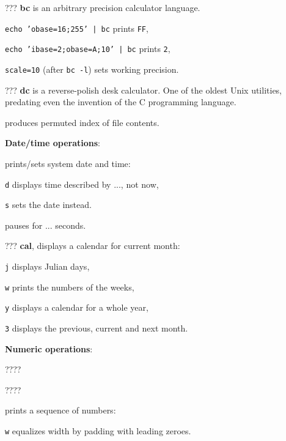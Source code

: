 \begin{compactenum}
\item [???] \textbf{bc} is an arbitrary precision calculator language.
\item \texttt{echo 'obase=16;255' | bc} prints \texttt{FF},
\item \texttt{echo 'ibase=2;obase=A;10' | bc} prints \texttt{2},
\item \texttt{scale=10} (after \texttt{bc -l}) sets working precision.
\item [???] \textbf{dc} is a reverse-polish desk calculator.
One of the oldest Unix utilities, 
predating even the invention of the C programming language.
\item [\symbolcoreutils]  produces permuted index of file contents.
\end{compactenum}

\textbf{Date/time operations}:
\begin{compactenum}
\item [\symbolcoreutils]  prints/sets system date and time:
\item [\texttt{d}] displays time described by ..., not now,
\item [\texttt{s}] sets the date instead.

\item [\symbolcoreutils]  pauses for ... seconds.

\item [???] \textbf{cal}, displays a calendar for current month:
\item [\texttt{j}] displays Julian days,
\item [\texttt{w}] prints the numbers of the weeks,
\item [\texttt{y}] displays a calendar for a whole year,
\item [\texttt{3}] displays the previous, current and next month.
\end{compactenum}

\textbf{Numeric operations}:
\begin{compactenum}
\item [\symbolcoreutils]  \dotfill ????

\item [\symbolcoreutils]  \dotfill ????

\item [\symbolcoreutils]  prints a sequence of numbers:
\item [\texttt{w}] equalizes width by padding with leading zeroes.
\end{compactenum}

